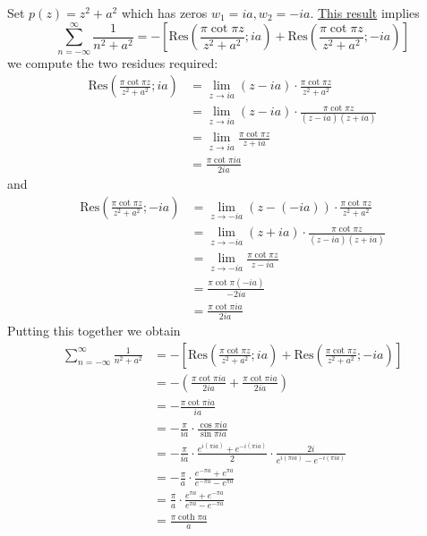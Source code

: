 \documentclass[12pt]{article}
\begin{document}
Set $p(z)= z^2+a^2$ which has zeros $w_1=ia, w_2=-ia$. \hyperlink{integral-of-1-over-pn}{This result} implies 
\[\sum_{n=-\infty}^{\infty}{\frac{1}{n^{2}+a^{2}}}=-\left[\mathrm{Res}\left({\frac{\pi\cot\pi z}{z^{2}+a^{2}}};i a\right)+\mathrm{Res}\left({\frac{\pi\cot\pi z}{z^{2}+a^{2}}};-i a\right)\right]
\]
we compute the two residues required:
\begin{align*}
    \mathrm{Res}\left(\frac{\pi\cot\pi z}{z^{2}+a^{2}};ia\right)&=\operatorname*{lim}_{z\to ia}\left(z-ia\right)\cdot\frac{\pi\cot\pi z}{z^{2}+a^{2}}\\
    &=\operatorname*{lim}_{z\to ia}\left(z-ia\right)\cdot\frac{\pi\cot\pi z}{(z-ia)(z+ia)}\\
    &=\operatorname*{lim}_{z\to ia}\frac{\pi\cot\pi z}{z+ia}\\ &=\frac{\pi\cot\pi ia}{2ia}
\end{align*}
and \begin{align*}
    \mathrm{Res}\left({\frac{\pi\cot\pi z}{z^{2}+a^{2}}};-i a\right)&=\operatorname*{lim}_{z\to-i a}(z-(-i a))\cdot{\frac{\pi\cot\pi z}{z^{2}+a^{2}}}\\
    &=\operatorname*{lim}_{z\to-i a}(z+i a)\cdot{\frac{\pi\cot\pi z}{(z-i a)(z+i a)}}\\
    &=\operatorname*{lim}_{z\to-i a}{\frac{\pi\cot\pi z}{z-i a}}\\
    &={\frac{\pi\cot\pi(-i a)}{-2i a}}\\
    &={\frac{\pi\cot\pi i a}{2i a}}
\end{align*}
Putting this together we obtain \begin{align*}
    \sum_{n=-\infty}^{\infty}{\frac{1}{n^{2}+a^{2}}}&=-\left[\mathrm{Res}\left({\frac{\pi\cot\pi z}{z^{2}+a^{2}}};i a\right)+\mathrm{Res}\left({\frac{\pi\cot\pi z}{z^{2}+a^{2}}};-i a\right)\right]\\
    &= -\left(\frac{\pi\cot\pi i a}{2i a}+\frac{\pi\cot\pi i a}{2i a}\right)\\
    &=-\frac{\pi\cot\pi i a}{i a}\\
    &=-\frac{\pi}{i a}\cdot\frac{\cos\pi i a}{\sin\pi i a}\\
    &=-\frac{\pi}{i a}\cdot\frac{e^{i(\pi i a)}+e^{-i(\pi i a)}}{2}\cdot\frac{2i}{e^{i(\pi i a)}-e^{-i(\pi i a)}}\\
    &=-\frac{\pi}{a}\cdot\frac{e^{-\pi a}+e^{\pi a}}{e^{-\pi a}-e^{\pi a}}\\
    &=\frac{\pi}{a}\cdot\frac{e^{\pi a}+e^{-\pi a}}{e^{\pi a}-e^{-\pi a}}\\
    &=\frac{\pi\coth\pi a}{a}
\end{align*}
\end{document}
